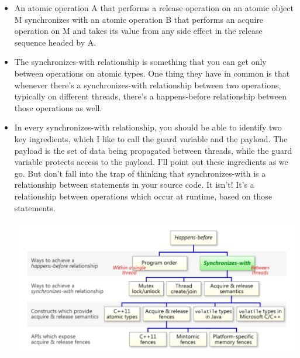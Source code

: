 \documentclass[a4paper,11pt,twoside]{book}
\begin{document}
\begin{itemize}
\begin{lstlisting}
int isReady = 0;
int answer = 0;

void publishMessage(){
    answer = 42;                      // (1)
    isReady = 1;                      // (2)
}

void consumeMessage(){
    if (isReady)        // (3) <-- Let's suppose this line reads 1
        printf("%d\n", answer);       // (4)
}
\end{lstlisting}



		\item An atomic operation A that performs a release operation on an atomic object M synchronizes with an atomic operation B that performs an acquire operation on M and takes its value from any side effect in the release sequence headed by A.

		\item The synchronizes-with relationship is something that you can get only between operations on atomic types. One thing they have in common is that whenever there’s a synchronizes-with relationship between two operations, typically on different threads, there’s a happens-before relationship between those operations as well.

		\item In every synchronizes-with relationship, you should be able to identify two key ingredients, which I like to call the guard variable and the payload. The payload is the set of data being propagated between threads, while the guard variable protects access to the payload. I’ll point out these ingredients as we go. But don’t fall into the trap of thinking that synchronizes-with is a relationship between statements in your source code. It isn’t! It’s a relationship between operations which occur at runtime, based on those statements.


\begin{center}
	\includegraphics[width=0.85\linewidth]{pics/happen_before.png}
\end{center}


\end{itemize}
\end{document}
